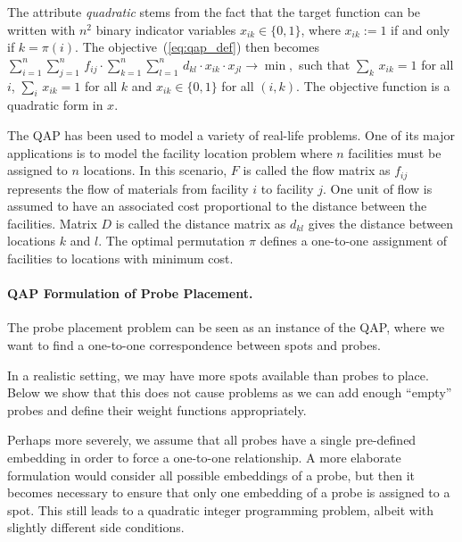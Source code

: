 \documentclass[english]{lni}
\newcommand{\ignore}[1]{}
\begin{document}
The attribute \emph{quadratic} stems from the fact that the target function
can be written with $n^2$ binary indicator variables $x_{ik}\in\{0,1\}$, where
$x_{ik}:=1$ if and only if $k=\pi(i)$. The objective~(\ref{eq:qap_def}) then
becomes
$
  \sum_{i=1}^{n} \sum_{j=1}^{n}\,  f_{ij} \cdot 
  \sum_{k=1}^{n} \sum_{l=1}^{n}\,  d_{kl} \cdot x_{ik}\cdot x_{jl}
  \to \min,
$
such that $\sum_{k}\, x_{ik}=1$ for all $i$, $\sum_{i}\, x_{ik}=1$ for all $k$
and $x_{ik}\in\{0,1\}$ for all $(i,k)$. The objective function is a quadratic
form in $x$.

The QAP has been used to model a variety of real-life problems. One of its
major applications is to model the facility location problem where $n$
facilities must be assigned to $n$ locations. In this scenario, $F$ is called
the flow matrix as $f_{ij}$ represents the flow of materials from facility $i$
to facility $j$. One unit of flow is assumed to have an associated cost
proportional to the distance between the facilities. Matrix $D$ is called the
distance matrix as $d_{kl}$ gives the distance between locations $k$ and $l$.
The optimal permutation $\pi$ defines a one-to-one assignment of facilities to
locations with minimum cost.

\paragraph{QAP Formulation of Probe Placement.}
The probe placement problem can be seen as an instance of the QAP, where we
want to find a one-to-one correspondence between spots and probes.
\ignore{
To
formulate it, we use the facility location example by viewing the probes as
locations and the spots as facilities, i.e., the spots are assigned to the
probes. In this case the flow matrix $F$ contains the ``closeness'' values
between spots, and the distance matrix $D$ contains the (weighted) Hamming
distances between probe embeddings.  We first give the general formulation for
conflict index; the case of border length minimization is obtained by using
the particular weight functions given at the end of
Section~\ref{sec:model}.
}
In a realistic setting, we may have more spots available than probes
to place. Below we show that this does not cause problems as we can add enough
``empty'' probes and define their weight functions appropriately.

Perhaps more severely, we assume that all probes have a single pre-defined
embedding in order to force a one-to-one relationship.  A more elaborate
formulation would consider all possible embeddings of a probe, but then it
becomes necessary to ensure that only one embedding of a probe is assigned to
a spot. This still leads to a quadratic integer programming problem, albeit
with slightly different side conditions.
\end{document}
